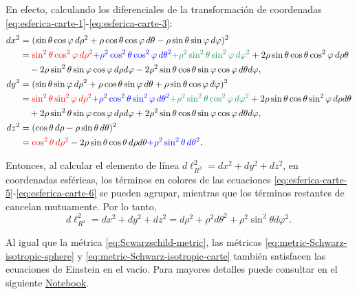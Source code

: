 \documentclass[letterpaper,11pt]{article}
\begin{document}
En efecto, calculando los diferenciales de la transformación de coordenadas \eqref{eq:esferica-carte-1}-\eqref{eq:esferica-carte-3}:
\begin{align}
    dx^2 &= (\sin\theta \cos\varphi \,d\rho^2 + \rho \cos\theta\cos\varphi \,d\theta - \rho \sin\theta \sin \varphi \,d\varphi)^2 \nonumber\\
    &= {\color{red} \sin^2\theta \cos^2\varphi \,d\rho^2}  {\color{blue} + \rho^2 \cos^2\theta \cos^2\varphi \,d\theta^2} {\color{ForestGreen} + \rho^2 \sin^2\theta \sin^2\varphi \,d\varphi^2} + 2\rho \sin\theta \cos\theta \cos^2\varphi \,d\rho\theta \nonumber\\
    & \quad  - 2\rho \sin^2\theta \sin\varphi \cos\varphi \,d\rho d\varphi - 2\rho^2 \sin\theta \cos\theta \sin\varphi \cos\varphi \,d\theta d\varphi,  \label{eq:esferica-carte-4}\\
    dy^2 &= (\sin\theta \sin\varphi \,d\rho^2 + \rho \cos\theta\sin\varphi \,d\theta + \rho \sin\theta \cos \varphi \,d\varphi)^2 \nonumber\\
    &= {\color{red}\sin^2\theta \sin^2\varphi \,d\rho^2}  {\color{blue} + \rho^2 \cos^2\theta \sin^2\varphi \,d\theta^2}  {\color{ForestGreen} + \rho^2 \sin^2\theta \cos^2\varphi\,d\varphi^2} + 2 \rho\sin\theta \cos\theta \sin^2\varphi \,d\rho d\theta \nonumber \\
    & \quad  + 2 \rho\sin^2\theta \sin\varphi \cos\varphi \,d\rho 
    d\varphi + 2 \rho^2 \sin\theta \cos\theta \sin\varphi \cos \varphi \,d\theta d\varphi, \label{eq:esferica-carte-5}\\
    dz^2 &= (\cos\theta \,d\rho - \rho\sin \theta \,d\theta)^2 \nonumber\\
    &= {\color{red}\cos^2\theta \,d\rho^2} - 2 \rho\sin\theta \cos\theta \,d\rho d\theta  {\color{blue} +
    \rho^2 \sin^2\theta \,d\theta^2}. \label{eq:esferica-carte-6}
\end{align}

 Entonces, al calcular el elemento de línea $d\ell^2_{R^3} = dx^2 + dy^2 + dz^2$, en coordenadas esféricas, los términos en colores de las ecuaciones \eqref{eq:esferica-carte-5}-\eqref{eq:esferica-carte-6} se pueden agrupar, mientras que los términos restantes de cancelan mutuamente. Por lo tanto, 
\begin{equation}
    d\ell^2_{R^3} = dx^2 + dy^2 + dz^2 = d \rho^2 + \rho^2 d\theta^2 + \rho^2 \sin^2\theta d\varphi^2.
\end{equation}

Al igual que la métrica \eqref{eq:Scwarzschild-metric}, las métricas \eqref{eq:metric-Schwarz-isotropic-sphere} y \eqref{eq:metric-Schwarz-isotropic-carte} también satisfacen las ecuaciones de Einstein en el vacío. Para mayores detalles puede consultar en el siguiente \href{https://github.com/AleSaa66/Topicos-RG/blob/main/Semana%201/Semana-1.ipynb}{Notebook}.
\end{document}
